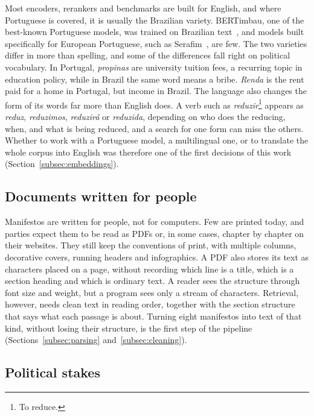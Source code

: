 Most encoders, rerankers and benchmarks are built for English, and where Portuguese is covered, it is usually the Brazilian variety. BERTimbau, one of the best-known Portuguese models, was trained on Brazilian text~\citep{souza2020bertimbau}, and models built specifically for European Portuguese, such as Serafim~\citep{gomes2024serafim}, are few. The two varieties differ in more than spelling, and some of the differences fall right on political vocabulary. In Portugal, \textit{propinas} are university tuition fees, a recurring topic in education policy, while in Brazil the same word means a bribe. \textit{Renda} is the rent paid for a home in Portugal, but income in Brazil. The language also changes the form of its words far more than English does. A verb such as \textit{reduzir}\footnote{To reduce.} appears as \textit{reduz}, \textit{reduzimos}, \textit{reduzirá} or \textit{reduzida}, depending on who does the reducing, when, and what is being reduced, and a search for one form can miss the others. Whether to work with a Portuguese model, a multilingual one, or to translate the whole corpus into English was therefore one of the first decisions of this work (Section~\ref{subsec:embeddings}).

\subsection{Documents written for people} \label{subsec:challenge-documents}

Manifestos are written for people, not for computers. Few are printed today, and parties expect them to be read as PDFs or, in some cases, chapter by chapter on their websites. They still keep the conventions of print, with multiple columns, decorative covers, running headers and infographics. A PDF also stores its text as characters placed on a page, without recording which line is a title, which is a section heading and which is ordinary text. A reader sees the structure through font size and weight, but a program sees only a stream of characters. Retrieval, however, needs clean text in reading order, together with the section structure that says what each passage is about. Turning eight manifestos into text of that kind, without losing their structure, is the first step of the pipeline (Sections~\ref{subsec:parsing} and~\ref{subsec:cleaning}).

\subsection{Political stakes} \label{subsec:challenge-stakes}

